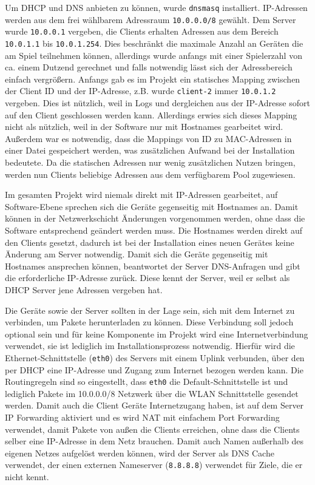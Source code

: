 Um DHCP und DNS anbieten zu können, wurde \texttt{dnsmasq} installiert. IP-Adressen
werden aus dem frei wählbarem Adressraum \texttt{10.0.0.0/8} gewählt. Dem Server wurde
\texttt{10.0.0.1} vergeben, die Clients erhalten Adressen aus dem Bereich \texttt{10.0.1.1} bis
\texttt{10.0.1.254}. Dies beschränkt die maximale Anzahl an Geräten die am Spiel
teilnehmen können, allerdings wurde anfangs mit einer Spielerzahl von ca.
einem Dutzend gerechnet und falls notwendig lässt sich der Adressbereich einfach
vergrößern. Anfangs gab es im Projekt ein statisches Mapping zwischen der
Client ID und der IP-Adresse, z.B. wurde \texttt{client-2} immer \texttt{10.0.1.2} vergeben.
Dies ist nützlich, weil in Logs und dergleichen aus der IP-Adresse sofort auf
den Client geschlossen werden kann. Allerdings erwies sich dieses Mapping nicht
als nützlich, weil in der Software nur mit Hostnames gearbeitet wird. Außerdem
war es notwendig, dass die Mappings von ID zu MAC-Adressen in einer Datei
gespeichert werden, was zusätzlichen Aufwand bei der Installation bedeutete.
Da die statischen Adressen nur wenig zusätzlichen Nutzen bringen, werden nun
Clients beliebige Adressen aus dem verfügbarem Pool zugewiesen.

Im gesamten Projekt wird niemals direkt mit IP-Adressen gearbeitet, auf
Software-Ebene sprechen sich die Geräte gegenseitig mit Hostnames an. Damit
können in der Netzwerkschicht Änderungen vorgenommen werden, ohne dass die
Software entsprechend geändert werden muss. Die Hostnames werden direkt auf
den Clients gesetzt, dadurch ist bei der Installation eines neuen Gerätes keine
Änderung am Server notwendig. Damit sich die Geräte gegenseitig mit Hostnames
ansprechen können, beantwortet der Server DNS-Anfragen und gibt die
erforderliche IP-Adresse zurück. Diese kennt der Server, weil er selbst als
DHCP Server jene Adressen vergeben hat.

Die Geräte sowie der Server sollten in der Lage sein, sich mit dem Internet
zu verbinden, um Pakete herunterladen zu können. Diese Verbindung soll jedoch
optional sein und für keine Komponente im Projekt wird eine Internetverbindung
verwendet, sie ist lediglich im Installationsprozess notwendig. Hierfür wird
die Ethernet-Schnittstelle (\texttt{eth0}) des Servers mit einem Uplink verbunden, über
den per DHCP eine IP-Adresse und Zugang zum Internet bezogen werden kann. Die
Routingregeln sind so eingestellt, dass \texttt{eth0} die Default-Schnittstelle ist und
lediglich Pakete im 10.0.0.0/8 Netzwerk über die WLAN Schnittstelle gesendet
werden. Damit auch die Client Geräte Internetzugang haben, ist auf dem Server
IP Forwarding aktiviert und es wird NAT mit einfachem Port Forwarding verwendet,
damit Pakete von außen die Clients erreichen, ohne dass die Clients selber eine
IP-Adresse in dem Netz brauchen. Damit auch Namen außerhalb des eigenen Netzes
aufgelöst werden können, wird der Server als DNS Cache verwendet, der einen externen
Nameserver (\texttt{8.8.8.8}) verwendet für Ziele, die er nicht kennt.
